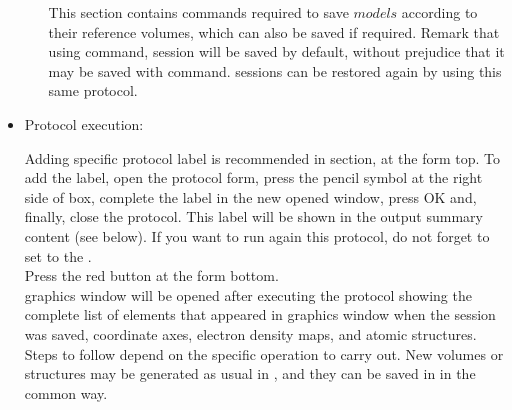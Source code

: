 \begin{itemize}
\begin{itemize}
    This section contains \chimera commands required to save $models$ according to their reference volumes, which can also be saved if required. Remark that using  command, \chimera session will be saved by default, without prejudice that it may be saved with  command. \chimera sessions can be restored again by using this same  protocol.
    
    \end{itemize}

  \item Protocol execution:
  
  Adding specific protocol label is recommended in  section, at the form top. To add the label, open the protocol form, press the pencil symbol at the right side of  box, complete the label in the new opened window, press OK and, finally, close the protocol. This label will be shown in the output summary content (see below). If you want to run again this protocol, do not forget to set to  the .\\
  Press the  red button at the form bottom.\\
  
  \chimera graphics window will be opened after executing the protocol showing the complete list of elements that appeared in \chimera graphics window when the session was saved, coordinate axes, electron density maps, and atomic structures. Steps to follow depend on the specific operation to carry out. New volumes or structures may be generated as usual in \chimera, and they can be saved in \scipion in the common way.
  \begin{itemize}
   

\end{itemize}
\end{itemize}
